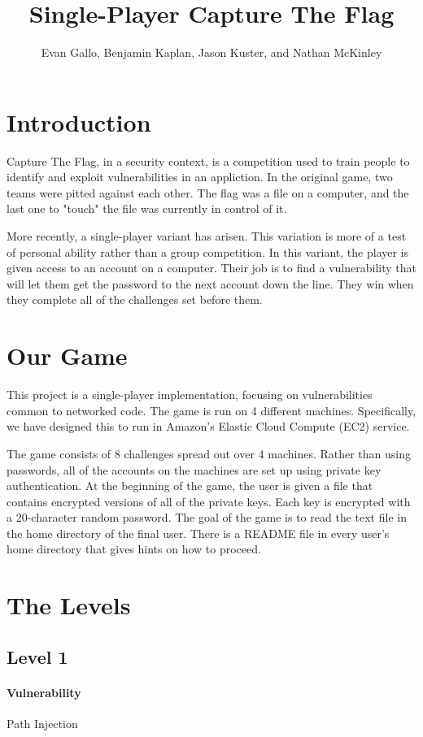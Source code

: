 \documentclass[12pt]{article}
\title{Single-Player Capture The Flag}
\author{Evan Gallo, Benjamin Kaplan, Jason Kuster, and Nathan McKinley}
\begin{document}
\maketitle
\tableofcontents
\section{Introduction}
Capture The Flag, in a security context, is a competition used to train people
to identify and exploit vulnerabilities in an appliction. In the original game,
two teams were pitted against each other. The flag was a file on a computer,
and the last one to "touch" the file was currently in control of it.

More recently, a single-player variant has arisen. This variation is more of a
test of personal ability rather than a group competition. In this variant, the
player is given access to an account on a computer. Their job is to find a
vulnerability that will let them get the password to the next account down the
line. They win when they complete all of the challenges set before them.

\section{Our Game}
This project is a single-player implementation, focusing on vulnerabilities
common to networked code. The game is run on 4 different machines.
Specifically, we have designed this to run in Amazon's Elastic Cloud Compute
(EC2) service.

The game consists of 8 challenges spread out over 4 machines. Rather than using
passwords, all of the accounts on the machines are set up using private key
authentication. At the beginning of the game, the user is given a file that
contains encrypted versions of all of the private keys. Each key is encrypted
with a 20-character random password. The goal of the game is to read the text
file in the home directory of the final user. There is a README file in every
user's home directory that gives hints on how to proceed. 

\section{The Levels}

\subsection{Level 1}
\paragraph{Vulnerability} Path Injection
\end{document}

